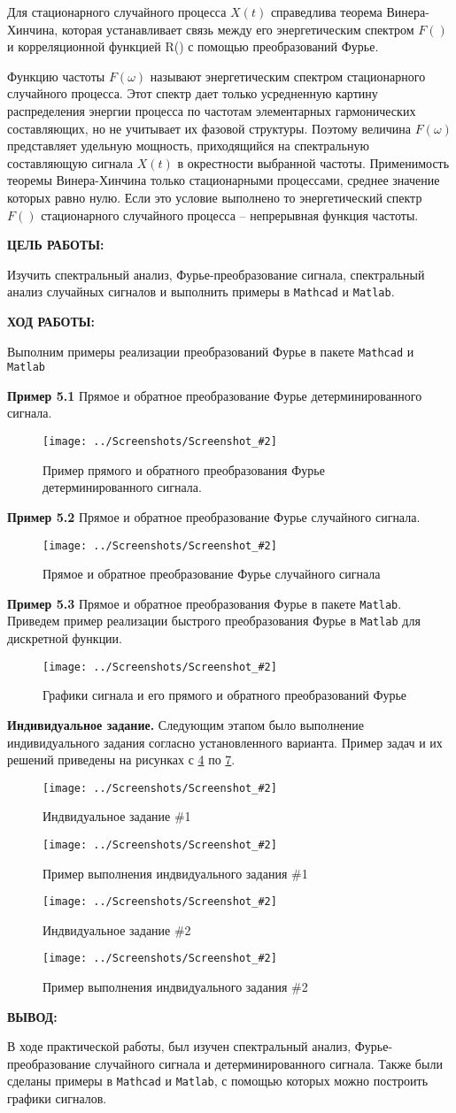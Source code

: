 \documentclass[14pt,a4paper]{extreport}
\newcommand{\sshot}[2]{\begin{figure}[ht]%
\centering\texttt{[image: ../Screenshots/Screenshot\_\#2]}%
\caption{#1}%
\label{sshot#2}%
\end{figure}%
}
\newcommand{\header}[1]{%
{
\clearpage%
\fontsize{16pt}{14pt}\selectfont
\begin{center}
\textbf{\MakeUppercase{#1}:}
\end{center}
}
}
\newcommand{\mathcad}{\texttt{Mathcad}}
\newcommand{\matlab}{\texttt{Matlab}}
\begin{document}
Для стационарного случайного процесса $X(t)$ справедлива теорема Винера-Хинчина, которая устанавливает связь между его энергетическим спектром $F()$ и корреляционной функцией R() с помощью преобразований Фурье.

Функцию частоты $F(\omega)$ называют энергетическим спектром стационарного случайного процесса. Этот спектр дает только усредненную картину распределения энергии процесса по частотам элементарных гармонических составляющих, но не учитывает их фазовой структуры. Поэтому величина $F(\omega)$ представляет удельную мощность, приходящийся на спектральную составляющую сигнала $X(t)$ в окрестности выбранной частоты. Применимость теоремы Винера-Хинчина только стационарными процессами, среднее значение которых равно нулю. Если это условие выполнено то энергетический спектр $F()$ стационарного случайного процесса -- непрерывная функция частоты.

\header{Цель работы}

Изучить спектральный анализ, Фурье-преобразование сигнала, спектральный анализ случайных сигналов и выполнить примеры в \mathcad{} и \matlab{}.

\header{Ход работы}

Выполним примеры реализации преобразований Фурье в пакете \mathcad{} и \matlab{}

\vspace{50pt}

\textbf{Пример 5.1 } Прямое и обратное преобразование Фурье детерминированного сигнала.

\sshot{Пример прямого и обратного преобразования Фурье детерминированного сигнала.}{1}

\clearpage

\textbf{Пример 5.2 } Прямое и обратное преобразование Фурье случайного сигнала.

\sshot{Прямое и обратное преобразование Фурье случайного сигнала}{2}

\clearpage

\textbf{Пример 5.3 } Прямое и обратное преобразования Фурье в пакете \matlab {}. Приведем пример реализации быстрого преобразования Фурье в \matlab{} для дискретной функции.

\sshot{Графики сигнала и его прямого и обратного преобразований Фурье}{3}

\clearpage 

\textbf{Индивидуальное задание. } Следующим этапом было выполнение индивидуального задания согласно установленного варианта. Пример задач и их решений приведены на рисунках с \ref{sshot4} по \ref{sshot7}.

\sshot{Индвидуальное задание \#1}{4}
\sshot{Пример выполнения индвидуального задания \#1}{5}
\sshot{Индвидуальное задание \#2}{6}
\sshot{Пример выполнения индвидуального задания \#2}{7}

\header{Вывод}


В ходе практической работы, был изучен спектральный анализ, Фурье-преобразование случайного сигнала и детерминированного сигнала. Также были сделаны примеры в \mathcad{} и \matlab{}, с помощью которых можно построить графики сигналов.
\end{document}
